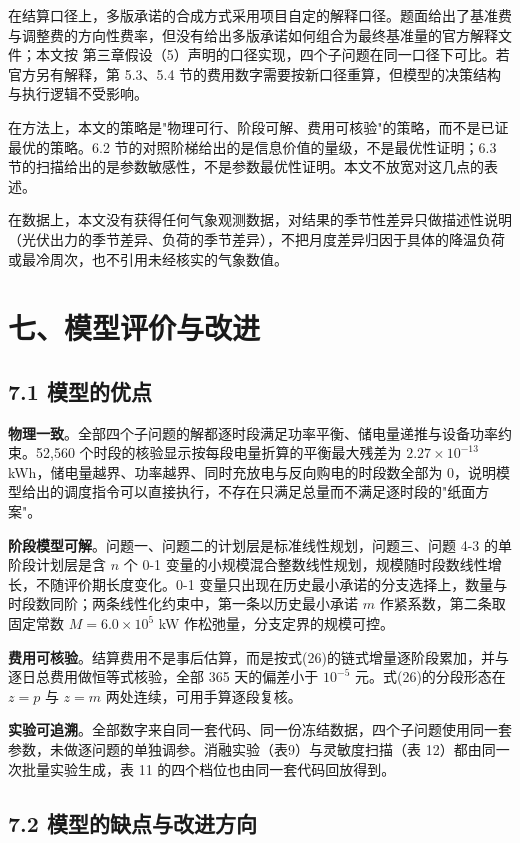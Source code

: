 \documentclass[12pt,a4paper]{ctexart}
\begin{document}
在结算口径上，多版承诺的合成方式采用项目自定的解释口径。题面给出了基准费与调整费的方向性费率，但没有给出多版承诺如何组合为最终基准量的官方解释文件；本文按 第三章假设（5）声明的口径实现，四个子问题在同一口径下可比。若官方另有解释，第 5.3、5.4 节的费用数字需要按新口径重算，但模型的决策结构与执行逻辑不受影响。

在方法上，本文的策略是"物理可行、阶段可解、费用可核验"的策略，而不是已证最优的策略。6.2 节的对照阶梯给出的是信息价值的量级，不是最优性证明；6.3 节的扫描给出的是参数敏感性，不是参数最优性证明。本文不放宽对这几点的表述。

在数据上，本文没有获得任何气象观测数据，对结果的季节性差异只做描述性说明（光伏出力的季节差异、负荷的季节差异），不把月度差异归因于具体的降温负荷或最冷周次，也不引用未经核实的气象数值。

\section*{七、模型评价与改进}

\subsection*{7.1 模型的优点}

\textbf{物理一致}。全部四个子问题的解都逐时段满足功率平衡、储电量递推与设备功率约束。52,560 个时段的核验显示按每段电量折算的平衡最大残差为 $2.27\times10^{-13}$ kWh，储电量越界、功率越界、同时充放电与反向购电的时段数全部为 0，说明模型给出的调度指令可以直接执行，不存在只满足总量而不满足逐时段的"纸面方案"。

\textbf{阶段模型可解}。问题一、问题二的计划层是标准线性规划，问题三、问题 4-3 的单阶段计划层是含 $n$ 个 0-1 变量的小规模混合整数线性规划，规模随时段数线性增长，不随评价期长度变化。0-1 变量只出现在历史最小承诺的分支选择上，数量与时段数同阶；两条线性化约束中，第一条以历史最小承诺 $m$ 作紧系数，第二条取固定常数 $M=6.0\times10^{5}$ kW 作松弛量，分支定界的规模可控。

\textbf{费用可核验}。结算费用不是事后估算，而是按式(26)的链式增量逐阶段累加，并与逐日总费用做恒等式核验，全部 365 天的偏差小于 $10^{-5}$ 元。式(26)的分段形态在 $z=p$ 与 $z=m$ 两处连续，可用手算逐段复核。

\textbf{实验可追溯}。全部数字来自同一套代码、同一份冻结数据，四个子问题使用同一套参数，未做逐问题的单独调参。消融实验（表9）与灵敏度扫描（表 12）都由同一次批量实验生成，表 11 的四个档位也由同一套代码回放得到。

\subsection*{7.2 模型的缺点与改进方向}
\end{document}
